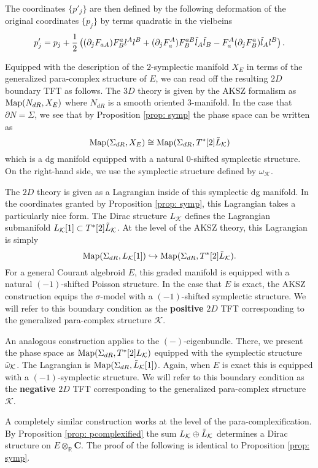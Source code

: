 \documentclass[letterpaper,12pt]{article}
\newcommand{\KK}{\mathcal{K}}
\newcommand{\Cc}{\mathbf{C}}
\newcommand{\RR}{\mathbb{R}}
\newcommand{\p}{\partial}
\theoremstyle{definition}
\theoremstyle{remark}
\theoremstyle{examples}
\begin{document}
The coordinates $\{p'_j\}$ are then defined by the following deformation of the original coordinates $\{p_j\}$ by terms quadratic in the vielbeins
\begin{align*}
p'_j=p_j+ \frac{1}{2}\left((\p_j F_{aA})F^{a}_Bl^Al^B +(\p_j F_{a}^A)F^{aB}_B \Tilde{l}_A\Tilde{l}_B-F_{a}^A(\p_j F^{a}_B)\Tilde{l}_Al^B\right).
\end{align*}

Equipped with the description of the $2$-symplectic manifold $X_E$ in terms of the generalized para-complex structure of $E$, we can read off the resulting $2D$ boundary TFT as follows.
The $3D$ theory is given by the AKSZ formalism as ${\rm Map}(N_{dR}, X_E)$ where $N_{dR}$ is a smooth oriented $3$-manifold.
In the case that $\partial N = \Sigma$, we see that by Proposition \ref{prop: symp} the phase space can be written as
\[
{\rm Map}(\Sigma_{dR} , X_E) \cong {\rm Map}(\Sigma_{dR}, T^*[2] \Tilde{L}_{\KK}) 
\]
which is a dg manifold equipped with a natural $0$-shifted symplectic structure.
On the right-hand side, we use the symplectic structure defined by $\omega_{\KK}$. 

The $2D$ theory is given as a Lagrangian inside of this symplectic dg manifold. 
In the coordinates granted by Proposition \ref{prop: symp}, this Lagrangian takes a particularly nice form.
The Dirac structure $L_\KK$ defines the Lagrangian submanifold $L_\KK[1] \subset T^*[2] \Tilde{L}_{\KK}$. 
At the level of the AKSZ theory, this Lagrangian is simply
\[
{\rm Map}(\Sigma_{dR}, L_{\KK} [1])  \hookrightarrow {\rm Map}(\Sigma_{dR} , T^*[2] \Tilde{L}_{\KK}) .
\]
For a general Courant algebroid $E$, this graded manifold is equipped with a natural $(-1)$-shifted Poisson structure. 
In the case that $E$ is exact, the AKSZ construction equips the $\sigma$-model with a $(-1)$-shifted symplectic structure. 
We will refer to this boundary condition as the {\bf positive} $2D$ TFT corresponding to the generalized para-complex structure $\KK$. 

An analogous construction applies to the $(-)$-eigenbundle.
There, we present the phase space as ${\rm Map}(\Sigma_{dR}, T^*[2] L_{\KK})$ equipped with the symplectic structure $\Tilde{\omega}_{\KK}$. 
The Lagrangian is ${\rm Map}(\Sigma_{dR}, \Tilde{L}_{\KK} [1])$. 
Again, when $E$ is exact this is equipped with a $(-1)$-symplectic structure. 
We will refer to this boundary condition as the {\bf negative} $2D$ TFT corresponding to the generalized para-complex structure $\KK$. 

A completely similar construction works at the level of the para-complexification. 
By Proposition \ref{prop: pcomplexified} the sum $L_\KK \oplus \Tilde{L}_{\KK}$ determines a Dirac structure on $E \otimes_\RR \Cc$. 
The proof of the following is identical to Proposition \ref{prop: symp}. 
\end{document}

